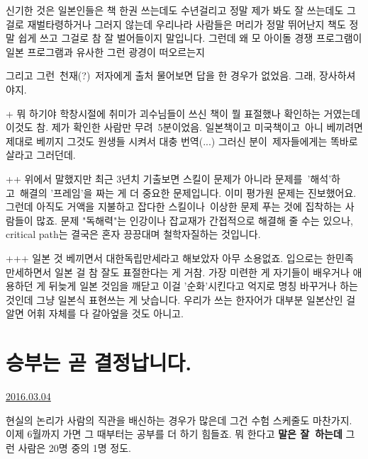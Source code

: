 신기한 것은
일본인들은 책 한권 쓰는데도 수년걸리고 정말 제가 봐도 잘 쓰는데도 그걸로 재벌타령하거나 그러지 않는데
우리나라 사람들은 머리가 정말 뛰어난지 책도 정말 쉽게 쓰고 그걸로 참 잘 벌어들이지 말입니다.
그런데 왜 모 아이돌 경쟁 프로그램이 일본 프로그램과 유사한 그런 광경이 떠오르는지
\vspace{5mm}

그리고 그런 천재(?) 저자에게 출처 물어보면 답을 한 경우가 없었음. 그래, 장사하셔야지.
\vspace{5mm}

+
뭐 하기야 학창시절에 취미가 괴수님들이 쓰신 책이 뭘 표절했나 확인하는 거였는데 이것도 참.
제가 확인한 사람만 무려 5분이었음. 일본책이고 미국책이고 아니 베끼려면 제대로 베끼지 그것도 원생들 시켜서 대충 번역(...)
그러신 분이 제자들에게는 똑바로 살라고 그러던데.
\vspace{5mm}

++
위에서 말했지만 최근 3년치 기출보면 스킬이 문제가 아니라 문제를 '해석'하고 해결의 '프레임'을 짜는 게 더 중요한 문제입니다.
이미 평가원 문제는 진보했어요. 그런데 아직도 거액을 지불하고 잡다한 스킬이나 이상한 문제 푸는 것에 집착하는 사람들이 많죠.
문제 "독해력"는 인강이나 잡교재가 간접적으로 해결해 줄 수는 있으나, critical path는 결국은 혼자 끙끙대며 철학자질하는 것입니다.
\vspace{5mm}

+++
일본 것 베끼면서 대한독립만세라고 해보았자 아무 소용없죠. 입으로는 한민족 만세하면서 일본 걸 참 잘도 표절한다는 게 거참.
가장 미련한 게 자기들이 배우거나 애용하던 게 뒤늦게 일본 것임을 깨닫고 이걸 '순화'시킨다고 억지로 명칭 바꾸거나 하는 것인데
그냥 일본식 표현쓰는 게 낫습니다. 우리가 쓰는 한자어가 대부분 일본산인 걸 알면 어휘 자체를 다 갈아엎을 것도 아니고.
\vspace{5mm}






\section{승부는 곧 결정납니다.}
\href{https://www.kockoc.com/Apoc/662562}{2016.03.04}

\vspace{5mm}

현실의 논리가 사람의 직관을 배신하는 경우가 많은데 그건 수험 스케줄도 마찬가지.
이제 6월까지 가면 그 때부터는 공부를 더 하기 힘들죠. 뭐 한다고 \textbf{말은 잘 하는데} 그런 사람은 20명 중의 1명 정도.
\vspace{5mm}


